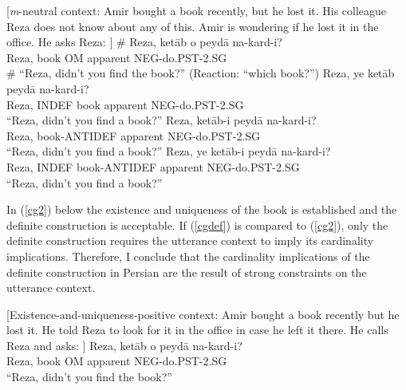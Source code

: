 \documentclass{salt}
\begin{document}
	\begin {exe}
	\ex \label {cg1}	\begin {xlist}
		\label {cgstatus}{\footnotesize[\emph{m}-neutral context: Amir bought a book recently, but he lost it. His colleague Reza does not know about any of this. Amir is wondering if he lost it in the office. He asks Reza: ]}
	\ex \label {cgdef} \gll	\# 	Reza,	ket\={a}b	o	peyd\={a}	na-kard-i?\\
			{}	Reza,	book	{\scriptsize OM}	apparent	{\scriptsize NEG}-do{\scriptsize .PST}-{\scriptsize 2.SG}\\
			\# ``Reza, didn't you find the book?'' {\small (Reaction: ``which book?'')}
		\ex	\label {cgsimpleindef} \gll	Reza, {\color {red}ye} ket\={a}b	peyd\={a} na-kard-i?\\
			Reza,	{\scriptsize INDEF} book	apparent	{\scriptsize NEG}-do{\scriptsize .PST}-{\scriptsize 2.SG}\\
			``Reza, didn't you find a book?''
		\ex	\label {cgantidef} \gll	Reza, ket\={a}b-{\color {blue}i}	peyd\={a} na-kard-i?\\
			Reza,	book-{\scriptsize ANTIDEF}	apparent	{\scriptsize NEG}-do{\scriptsize .PST}-{\scriptsize 2.SG}\\
			``Reza, didn't you find a book?''
		\ex	\label {cgcompindef} \gll	Reza, {\color {red}ye} ket\={a}b-{\color {blue}i}	peyd\={a} na-kard-i?\\
			Reza,	{\scriptsize INDEF} book-{\scriptsize ANTIDEF}	apparent	{\scriptsize NEG}-do{\scriptsize .PST}-{\scriptsize 2.SG}\\
			``Reza, didn't you find a book?''
	\end {xlist}
	\end {exe}

In (\ref{cg2}) below the existence and uniqueness of the book is established and the definite construction is acceptable. If (\ref{cgdef}) is compared	 to (\ref{cg2}), only the definite construction requires the utterance context to imply its cardinality implications. Therefore, I conclude that the cardinality implications of the definite construction in Persian are the result of strong constraints on the utterance context.

	\begin {exe}
	\ex \label{cg2} {\footnotesize [Existence-and-uniqueness-positive context: Amir bought a book recently but he lost it. He told Reza to look for it in the office in case he left it there. He calls Reza and asks: ]} \label {scfdef}
	 		\gll 	Reza,	ket\={a}b	o	peyd\={a}	na-kard-i?\\
				Reza,	book	{\scriptsize OM}	apparent	{\scriptsize NEG}-do{\scriptsize .PST}-{\scriptsize 2.SG}\\
			``Reza, didn't you find the book?''
	\end {exe}
\end{document}
